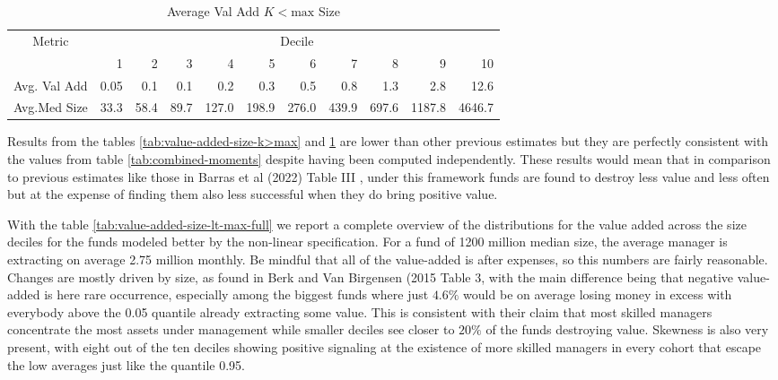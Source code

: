 \documentclass[12pt]{article}
\begin{document}
\begin{table}[H]
    \centering
    \begin{threeparttable}
        \caption{Average Val Add $K < \text{max}$ Size}
        \label{tab:value-added-size-k<max}
        \begin{tabular}{lrrrrrrrrrr}
            \toprule
            \multicolumn{1}{c}{Metric} & \multicolumn{10}{c}{Decile} \\
            \cmidrule(lr){2-11}
            \multicolumn{1}{c}{} & 1 & 2 & 3 & 4 & 5 & 6 & 7 & 8 & 9 & 10 \\
            \midrule
            Avg. Val Add & 0.05 & 0.1 & 0.1 & 0.2 & 0.3 & 0.5 & 0.8 & 1.3 & 2.8 & 12.6 \\
            Avg.Med Size & 33.3 & 58.4 & 89.7 & 127.0 & 198.9 & 276.0 & 439.9 & 697.6 & 1187.8 & 4646.7 \\
            \bottomrule
        \end{tabular}
    \end{threeparttable}
\end{table}

Results from the tables \ref{tab:value-added-size-k>max} and \ref{tab:value-added-size-k<max}  are lower than other previous estimates but they are perfectly consistent with the values from table \ref{tab:combined-moments} despite having been computed independently. These results would mean that in comparison to previous estimates like those in Barras et al (2022) Table III \cite{BarrasGagliardiniScaillet2021}, under this framework funds are found to destroy less value and less often but at the expense of finding them also less successful when they do bring positive value. 

\par With the table \ref{tab:value-added-size-lt-max-full} we report a complete overview of the distributions for the value added across the size deciles for the funds modeled better by the non-linear specification. For a fund of 1200 million median size, the average manager is extracting on average 2.75 million monthly. Be mindful that all of the value-added is after expenses, so this numbers are fairly reasonable. Changes are mostly driven by size, as found in Berk and Van Birgensen (2015 \cite{BERK20151} Table 3, with the main difference being that negative value-added is here rare occurrence, especially among the biggest funds where just $4.6\%$ would be on average losing money in excess with everybody above the 0.05 quantile already extracting some value. This is consistent with their claim that most skilled managers concentrate the most assets under management while smaller deciles see closer to $20\%$ of the funds destroying value. Skewness is also very present, with eight out of the ten deciles showing positive signaling at the existence of more skilled managers in every cohort that escape the low averages just like the quantile 0.95.
\end{document}
